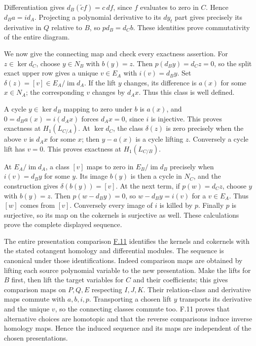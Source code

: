 \documentclass[11pt,a4paper,openany]{report}
\begin{document}
Differentiation gives \(d_B(\widetilde c f)=c\,df\), since \(f\) evaluates to zero in \(C\). Hence \(d_Ba=id_A\). Projecting a polynomial derivative to its \(dy_t\) part gives precisely its derivative in \(Q\) relative to \(B\), so \(pd_B=d_Cb\). These identities prove commutativity of the entire diagram.

We now give the connecting map and check every exactness assertion. For \(z\in\ker d_C\), choose \(y\in N_B\) with \(b(y)=z\). Then \(p(d_By)=d_Cz=0\), so the split exact upper row gives a unique \(v\in E_A\) with \(i(v)=d_By\). Set \(\delta(z)=[v]\in E_A/\operatorname{im}d_A\). If the lift \(y\) changes, its difference is \(a(x)\) for some \(x\in N_A\); the corresponding \(v\) changes by \(d_Ax\). Thus this class is well defined.

A cycle \(y\in\ker d_B\) mapping to zero under \(b\) is \(a(x)\), and \(0=d_Ba(x)=i(d_Ax)\) forces \(d_Ax=0\), since \(i\) is injective. This proves exactness at \(H_1(L_{C/A})\). At \(\ker d_C\), the class \(\delta(z)\) is zero precisely when the above \(v\) is \(d_Ax\) for some \(x\); then \(y-a(x)\) is a cycle lifting \(z\). Conversely a cycle lift has \(v=0\). This proves exactness at \(H_1(L_{C/B})\).

At \(E_A/\operatorname{im}d_A\), a class \([v]\) maps to zero in \(E_B/\operatorname{im}d_B\) precisely when \(i(v)=d_By\) for some \(y\). Its image \(b(y)\) is then a cycle in \(N_C\), and the construction gives \(\delta(b(y))=[v]\). At the next term, if \(p(w)=d_Cz\), choose \(y\) with \(b(y)=z\). Then \(p(w-d_By)=0\), so \(w-d_By=i(v)\) for a \(v\in E_A\). Thus \([w]\) comes from \([v]\). Conversely every image of \(i\) is killed by \(p\). Finally \(p\) is surjective, so its map on the cokernels is surjective as well. These calculations prove the complete displayed sequence.

The entire presentation comparison \hyperref[AG-RG-S05-algebra-lemma-NL-homotopy]{F.11} identifies the kernels and cokernels with the stated cotangent homology and differential modules. The sequence is canonical under those identifications. Indeed comparison maps are obtained by lifting each source polynomial variable to the new presentation. Make the lifts for \(B\) first, then lift the target variables for \(C\) and their coefficients; this gives comparison maps on \(P,Q,E\) respecting \(I,J,K\). Their relation-class and derivative maps commute with \(a,b,i,p\). Transporting a chosen lift \(y\) transports its derivative and the unique \(v\), so the connecting classes commute too. F.11 proves that alternative choices are homotopic and that the reverse comparisons induce inverse homology maps. Hence the induced sequence and its maps are independent of the chosen presentations.
\end{document}
